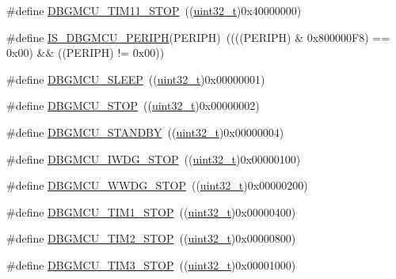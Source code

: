 \begin{DoxyCompactItemize}
\#define \hyperlink{group___d_b_g_m_c_u___exported___constants_gade03e5368c3bf8a2f43fc046f1d87f30}{D\+B\+G\+M\+C\+U\+\_\+\+T\+I\+M11\+\_\+\+S\+T\+OP}~((\hyperlink{_p_e___types_8h_a33594304e786b158f3fb30289278f5af}{uint32\+\_\+t})0x40000000)
\item 
\#define \hyperlink{group___d_b_g_m_c_u___exported___constants_ga96d44dc7861b6a3f364942704f323a45}{I\+S\+\_\+\+D\+B\+G\+M\+C\+U\+\_\+\+P\+E\+R\+I\+PH}(P\+E\+R\+I\+PH)~((((P\+E\+R\+I\+PH) \& 0x800000\+F8) == 0x00) \&\& ((\+P\+E\+R\+I\+P\+H) != 0x00))
\item 
\#define \hyperlink{group___d_b_g_m_c_u___exported___constants_ga1c457289646b9d9814b93fbb994c9930}{D\+B\+G\+M\+C\+U\+\_\+\+S\+L\+E\+EP}~((\hyperlink{_p_e___types_8h_a33594304e786b158f3fb30289278f5af}{uint32\+\_\+t})0x00000001)
\item 
\#define \hyperlink{group___d_b_g_m_c_u___exported___constants_ga4a71bcfa6868672674b5410d2fd372f4}{D\+B\+G\+M\+C\+U\+\_\+\+S\+T\+OP}~((\hyperlink{_p_e___types_8h_a33594304e786b158f3fb30289278f5af}{uint32\+\_\+t})0x00000002)
\item 
\#define \hyperlink{group___d_b_g_m_c_u___exported___constants_ga6eb848845f9207ffdccd0590da192002}{D\+B\+G\+M\+C\+U\+\_\+\+S\+T\+A\+N\+D\+BY}~((\hyperlink{_p_e___types_8h_a33594304e786b158f3fb30289278f5af}{uint32\+\_\+t})0x00000004)
\item 
\#define \hyperlink{group___d_b_g_m_c_u___exported___constants_ga5b8b38b5589a2e26a57325553b5dfe23}{D\+B\+G\+M\+C\+U\+\_\+\+I\+W\+D\+G\+\_\+\+S\+T\+OP}~((\hyperlink{_p_e___types_8h_a33594304e786b158f3fb30289278f5af}{uint32\+\_\+t})0x00000100)
\item 
\#define \hyperlink{group___d_b_g_m_c_u___exported___constants_ga9ecfb95a943e2ad165395fff4fa12770}{D\+B\+G\+M\+C\+U\+\_\+\+W\+W\+D\+G\+\_\+\+S\+T\+OP}~((\hyperlink{_p_e___types_8h_a33594304e786b158f3fb30289278f5af}{uint32\+\_\+t})0x00000200)
\item 
\#define \hyperlink{group___d_b_g_m_c_u___exported___constants_ga017fb3101a3569426e82b066cb2f8848}{D\+B\+G\+M\+C\+U\+\_\+\+T\+I\+M1\+\_\+\+S\+T\+OP}~((\hyperlink{_p_e___types_8h_a33594304e786b158f3fb30289278f5af}{uint32\+\_\+t})0x00000400)
\item 
\#define \hyperlink{group___d_b_g_m_c_u___exported___constants_ga8ba3a77260f748793c903468a4608bd1}{D\+B\+G\+M\+C\+U\+\_\+\+T\+I\+M2\+\_\+\+S\+T\+OP}~((\hyperlink{_p_e___types_8h_a33594304e786b158f3fb30289278f5af}{uint32\+\_\+t})0x00000800)
\item 
\#define \hyperlink{group___d_b_g_m_c_u___exported___constants_ga28c01c2c30bed78e51d997007986fac9}{D\+B\+G\+M\+C\+U\+\_\+\+T\+I\+M3\+\_\+\+S\+T\+OP}~((\hyperlink{_p_e___types_8h_a33594304e786b158f3fb30289278f5af}{uint32\+\_\+t})0x00001000)

\end{DoxyCompactItemize}

